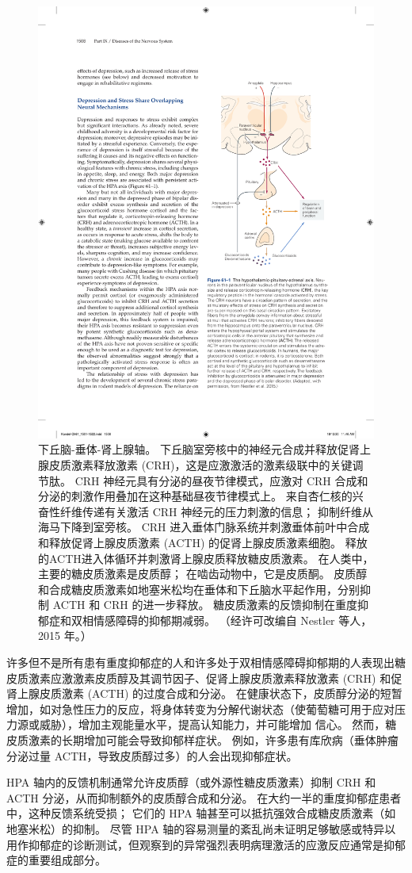 \begin{figure}[htbp]
	\centering
	\includegraphics[width=0.5\linewidth]{chap61/fig_61_1}
	\caption{下丘脑-垂体-肾上腺轴。 下丘脑室旁核中的神经元合成并释放促肾上腺皮质激素释放激素 (CRH)，这是应激激活的激素级联中的关键调节肽。 CRH 神经元具有分泌的昼夜节律模式，应激对 CRH 合成和分泌的刺激作用叠加在这种基础昼夜节律模式上。 来自杏仁核的兴奋性纤维传递有关激活 CRH 神经元的压力刺激的信息； 抑制纤维从海马下降到室旁核。 CRH 进入垂体门脉系统并刺激垂体前叶中合成和释放促肾上腺皮质激素 (ACTH) 的促肾上腺皮质激素细胞。 释放的ACTH进入体循环并刺激肾上腺皮质释放糖皮质激素。 在人类中，主要的糖皮质激素是皮质醇； 在啮齿动物中，它是皮质酮。 皮质醇和合成糖皮质激素如地塞米松均在垂体和下丘脑水平起作用，分别抑制 ACTH 和 CRH 的进一步释放。 糖皮质激素的反馈抑制在重度抑郁症和双相情感障碍的抑郁期减弱。 （经许可改编自 Nestler 等人，2015 年。）}
	\label{fig:61_1}
\end{figure}

许多但不是所有患有重度抑郁症的人和许多处于双相情感障碍抑郁期的人表现出糖皮质激素应激激素皮质醇及其调节因子、促肾上腺皮质激素释放激素 (CRH) 和促肾上腺皮质激素 (ACTH) 的过度合成和分泌。 在健康状态下，皮质醇分泌的短暂增加，如对急性压力的反应，将身体转变为分解代谢状态（使葡萄糖可用于应对压力源或威胁），增加主观能量水平，提高认知能力，并可能增加 信心。 然而，糖皮质激素的长期增加可能会导致抑郁样症状。 例如，许多患有库欣病（垂体肿瘤分泌过量 ACTH，导致皮质醇过多）的人会出现抑郁症状。

HPA 轴内的反馈机制通常允许皮质醇（或外源性糖皮质激素）抑制 CRH 和 ACTH 分泌，从而抑制额外的皮质醇合成和分泌。 在大约一半的重度抑郁症患者中，这种反馈系统受损； 它们的 HPA 轴甚至可以抵抗强效合成糖皮质激素（如地塞米松）的抑制。 尽管 HPA 轴的容易测量的紊乱尚未证明足够敏感或特异以用作抑郁症的诊断测试，但观察到的异常强烈表明病理激活的应激反应通常是抑郁症的重要组成部分。

